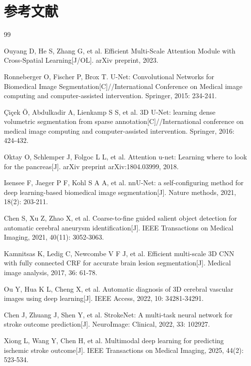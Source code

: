 \section{参考文献}

\begin{thebibliography}{99}

Ouyang D, He S, Zhang G, et al. Efficient Multi-Scale Attention Module with Cross-Spatial Learning[J/OL]. arXiv preprint, 2023.

Ronneberger O, Fischer P, Brox T. U-Net: Convolutional Networks for Biomedical Image Segmentation[C]//International Conference on Medical image computing and computer-assisted intervention. Springer, 2015: 234-241.

Çiçek Ö, Abdulkadir A, Lienkamp S S, et al. 3D U-Net: learning dense volumetric segmentation from sparse annotation[C]//International conference on medical image computing and computer-assisted intervention. Springer, 2016: 424-432.

Oktay O, Schlemper J, Folgoc L L, et al. Attention u-net: Learning where to look for the pancreas[J]. arXiv preprint arXiv:1804.03999, 2018.

Isensee F, Jaeger P F, Kohl S A A, et al. nnU-Net: a self-configuring method for deep learning-based biomedical image segmentation[J]. Nature methods, 2021, 18(2): 203-211.

Chen S, Xu Z, Zhao X, et al. Coarse-to-fine guided salient object detection for automatic cerebral aneurysm identification[J]. IEEE Transactions on Medical Imaging, 2021, 40(11): 3052-3063.

Kamnitsas K, Ledig C, Newcombe V F J, et al. Efficient multi-scale 3D CNN with fully connected CRF for accurate brain lesion segmentation[J]. Medical image analysis, 2017, 36: 61-78.

Ou Y, Hua K L, Cheng X, et al. Automatic diagnosis of 3D cerebral vascular images using deep learning[J]. IEEE Access, 2022, 10: 34281-34291.

Chen J, Zhuang J, Shen Y, et al. StrokeNet: A multi-task neural network for stroke outcome prediction[J]. NeuroImage: Clinical, 2022, 33: 102927.

Xiong L, Wang Y, Chen H, et al. Multimodal deep learning for predicting ischemic stroke outcome[J]. IEEE Transactions on Medical Imaging, 2025, 44(2): 523-534.


\end{thebibliography}
